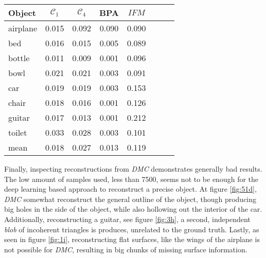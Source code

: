 \begin{center}
     \label{tab:distance7500} 
    \begin{tabular}{| l  | c | c | c | c | c | c | c |}
        \hline
        Object& $\mathcal{C}_1$ & $\mathcal{C}_4$ & BPA & $IFM$  \\ \hline
        airplane&0.015&0.092&0.090&0.090\\\hline
        bed&0.016&0.015&0.005&0.089\\\hline
        bottle&0.011&0.009&0.001&0.096\\\hline
        bowl&0.021&0.021&0.003&0.091\\\hline
        car&0.019&0.019&0.003&0.153\\\hline
        chair&0.018&0.016&0.001&0.126\\\hline
        guitar&0.017&0.013&0.001&0.212\\\hline
        toilet&0.033&0.028&0.003&0.101\\\hline\hline
        mean&0.018&0.027&0.013&0.119\\\hline
    \end{tabular}
\end{center}


Finally, inspecting reconstructions from \emph{DMC} demonstrates generally bad results. The low amount of samples used, less than 7500,
seems not to be enough for the deep learning based approach to reconstruct a precise object. At figure \ref{fig:51d}, \emph{DMC} somewhat
reconstruct the general outline of the object, though producing big holes in the side of the object, while also hollowing out the interior
of the car. Additionally, reconstructing a guitar, see figure \ref{fig:3h}, a second, independent \emph{blob} of incoherent triangles is 
produces, unrelated to the ground truth. Lastly, as seen in figure \ref{fig:1i}, reconstructing flat surfaces, like the wings of the airplane
is not possible for \emph{DMC}, resulting in big chunks of missing surface information.

